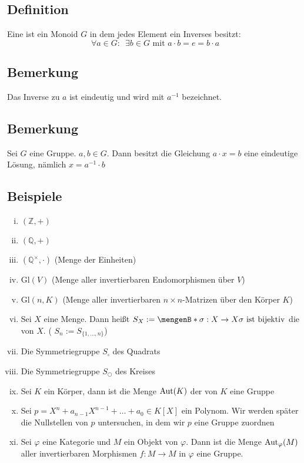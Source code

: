 \subsection[Definition: Gruppe]{Definition} %
\label{sub:12}
Eine  ist ein Monoid $G$ in dem jedes Element ein Inverses besitzt:
\[
	\forall a \in G : \enspace \exists b \in G \text{ mit } a \cdot b = e = b \cdot a
\] 

\subsection[Bemerkung: Eindeutigkeit des Inversen]{Bemerkung} %
\label{sub:13}
Das Inverse zu $a$ ist eindeutig und wird mit $a ^{-1}$ bezeichnet.

\subsection[Bemerkung: Lösbarkeit einfacher Gleichungen in Gruppen]{Bemerkung} %
\label{sub:14}
Sei $G$ eine Gruppe. $a, b \in G$. Dann besitzt die Gleichung $a \cdot x = b$ eine eindeutige Lösung, nämlich $x = a ^{-1} \cdot b$

\subsection[Beispiele für Gruppen]{Beispiele} %
\label{sub:15}
	\begin{enumerate}[i)]
		\item $(\mathds{Z}, +)$
		\item $ (\mathds{Q},+)$
		\item $(\mathds{Q}^\times, \cdot )$ \hfill {\small \color{light_gray}(Menge der Einheiten)}
		\item $\mathrm{Gl}(V)$ \hfill {\small \color{light_gray} (Menge aller invertierbaren Endomorphismen über $V$)}
		\item $\mathrm{Gl}(n,K)$ \hfill {\small \color{light_gray} (Menge aller invertierbaren $n \times n$-Matrizen über den Körper $K$)}
		\item \label{sym_grp} Sei $X$ eine Menge. Dann heißt $S_X := \set[\sigma : X \to X]{\sigma \text{ ist bijektiv}} $ die  von $X$. 
		( $S_n := S_{ \{ 1, \ldots , n\}} $) 
		\item Die Symmetriegruppe $S_\square$ des Quadrats
		\item Die Symmetriegruppe $S_\bigcirc$ des Kreises
		\item Sei $K$ ein Körper, dann ist die Menge $\operatorname{Aut}(K)$ der   von $K$ eine Gruppe
		\item Sei $p = X^n + a_{n-1} X^{n-1} + \ldots  + a_0 \in K[X]$ ein Polynom. Wir werden später die Nullstellen von $p$ untersuchen, in dem wir $p$ eine Gruppe 
		zuordnen
		\item Sei $\varphi$ eine Kategorie und $M$ ein Objekt von $\varphi$. Dann ist die Menge $\operatorname{Aut}_\varphi(M)$ aller invertierbaren Morphismen $f : M  \to M$ in $\varphi$
		eine Gruppe.
	\end{enumerate}

